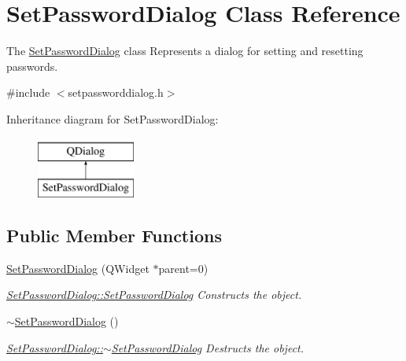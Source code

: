 \hypertarget{class_set_password_dialog}{}\section{Set\+Password\+Dialog Class Reference}
\label{class_set_password_dialog}


The \hyperlink{class_set_password_dialog}{Set\+Password\+Dialog} class Represents a dialog for setting and resetting passwords.  




{\ttfamily \#include $<$setpassworddialog.\+h$>$}

Inheritance diagram for Set\+Password\+Dialog\+:\begin{figure}[H]
\begin{center}
\leavevmode
\includegraphics[height=2.000000cm]{class_set_password_dialog}
\end{center}
\end{figure}
\subsection*{Public Member Functions}
\begin{DoxyCompactItemize}
\item 
\hyperlink{class_set_password_dialog_a6c0f4e419cde5431401dd4deeccb1a54}{Set\+Password\+Dialog} (Q\+Widget $\ast$parent=0)
\begin{DoxyCompactList}\small\item\em \hyperlink{class_set_password_dialog_a6c0f4e419cde5431401dd4deeccb1a54}{Set\+Password\+Dialog\+::\+Set\+Password\+Dialog} Constructs the object. \end{DoxyCompactList}\item 
\hypertarget{class_set_password_dialog_ae3dec5f6c8b27800757c928e7e61468c}{}\label{class_set_password_dialog_ae3dec5f6c8b27800757c928e7e61468c} 
\hyperlink{class_set_password_dialog_ae3dec5f6c8b27800757c928e7e61468c}{$\sim$\+Set\+Password\+Dialog} ()
\begin{DoxyCompactList}\small\item\em \hyperlink{class_set_password_dialog_ae3dec5f6c8b27800757c928e7e61468c}{Set\+Password\+Dialog\+::$\sim$\+Set\+Password\+Dialog} Destructs the object. \end{DoxyCompactList}\end{DoxyCompactItemize}



